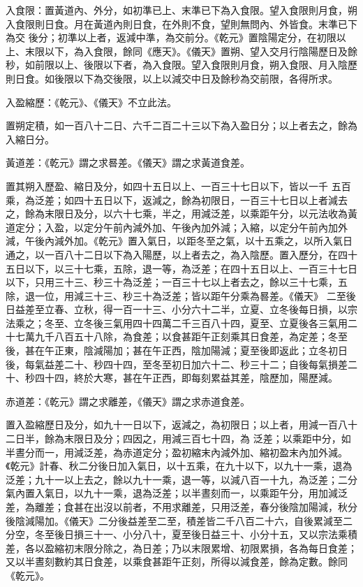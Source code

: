 \begin{pinyinscope}
 入食限：置黃道內、外分，如初準已上、末準已下為入食限。望入食限則月食，朔入食限則日食。月在黃道內則日食，在外則不食，望則無問內、外皆食。末準已下為交
 後分；初準以上者，返減中準，為交前分。《乾元》置陰陽定分，在初限以上、末限以下，為入食限，餘同《應天》。《儀天》置朔、望入交月行陰陽歷日及餘秒，如前限以上、後限以下者，為入食限。望入食限則月食，朔入食限、月入陰歷則日食。如後限以下為交後限，以上以減交中日及餘秒為交前限，各得所求。



 入盈縮歷：《乾元》、《儀天》不立此法。



 置朔定積，如一百八十二日、六千二百二十三以下為入盈日分；以上者去之，餘為入縮日分。



 黃道差：《乾元》謂之求晷差。《儀天》謂之求黃道食差。



 置其朔入歷盈、縮日及分，如四十五日以上、一百三十七日以下，皆以一千
 五百乘，為泛差；如四十五日以下，返減之，餘為初限日，一百三十七日以上者減去之，餘為末限日及分，以六十七乘，半之，用減泛差，以乘距午分，以元法收為黃道定分；入盈，以定分午前內減外加、午後內加外減；入縮，以定分午前內加外減，午後內減外加。《乾元》置入氣日，以距冬至之氣，以十五乘之，以所入氣日通之，以一百八十二日以下為入陽歷，以上者去之，為入陰歷。置入歷分，在四十五日以下，以三十七乘，五除，退一等，為泛差；在四十五日以上、一百三十七日以下，只用三十三、秒三十為泛差；一百三十七以上者去之，餘以三十七乘，五除，退一位，用減三十三、秒三十為泛差；皆以距午分乘為晷差。《儀天》
 二至後日益差至立春、立秋，得一百一十三、小分六十二半，立夏、立冬後每日損，以宗法乘之；冬至、立冬後三氣用四十四萬二千三百八十四，夏至、立夏後各三氣用二十七萬九千八百五十八除，為食差；以食甚距午正刻乘其日食差，為定差；冬至後，甚在午正東，陰減陽加；甚在午正西，陰加陽減；夏至後即返此；立冬初日後，每氣益差二十、秒四十四，至冬至初日加六十二、秒三十二；自後每氣損差二十、秒四十四，終於大寒，甚在午正西，即每刻累益其差，陰歷加，陽歷減。



 赤道差：《乾元》謂之求離差，《儀天》謂之求赤道食差。



 置入盈縮歷日及分，如九十一日以下，返減之，為初限日；以上者，用減一百八十二日半，餘為末限日及分；四因之，用減三百七十四，為
 泛差；以乘距中分，如半晝分而一，用減泛差，為赤道定分；盈初縮末內減外加、縮初盈末內加外減。《乾元》計春、秋二分後日加入氣日，以十五乘，在九十以下，以九十一乘，退為泛差；九十一以上去之，餘以九十一乘，退一等，以減八百一十九，為泛差；二分氣內置入氣日，以九十一乘，退為泛差；以半晝刻而一，以乘距午分，用加減泛差，為離差；食甚在出沒以前者，不用求離差，只用泛差，春分後陰加陽減，秋分後陰減陽加。《儀天》二分後益差至二至，積差皆二千八百二十六，自後累減至二分空，冬至後日損三十一、小分八十，夏至後日益三十、小分十五，又以宗法乘積差，各以盈縮初末限分除之，為日差；乃以末限累增、初限累損，各為每日食差；又以半晝刻數約其日食差，以乘食甚距午正刻，所得以減食差，餘為定數。餘同《乾元》。




\end{pinyinscope}
